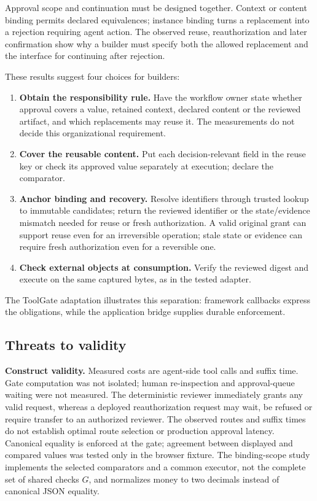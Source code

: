 Approval scope and continuation must be designed together. Context or content binding permits declared equivalences; instance binding turns a replacement into a rejection requiring agent action. The observed reuse, reauthorization and later confirmation show why a builder must specify both the allowed replacement and the interface for continuing after rejection.

These results suggest four choices for builders:
\begin{enumerate}
\tightlist
\item \textbf{Obtain the responsibility rule.} Have the workflow owner state whether approval covers a value, retained context, declared content or the reviewed artifact, and which replacements may reuse it. The measurements do not decide this organizational requirement.
\item \textbf{Cover the reusable content.} Put each decision-relevant field in the reuse key or check its approved value separately at execution; declare the comparator.
\item \textbf{Anchor binding and recovery.} Resolve identifiers through trusted lookup to immutable candidates; return the reviewed identifier or the state/evidence mismatch needed for reuse or fresh authorization. A valid original grant can support reuse even for an irreversible operation; stale state or evidence can require fresh authorization even for a reversible one.
\item \textbf{Check external objects at consumption.} Verify the reviewed digest and execute on the same captured bytes, as in the tested adapter.
\end{enumerate}

The ToolGate adaptation illustrates this separation: framework callbacks express the obligations, while the application bridge supplies durable enforcement.

\subsection{Threats to validity}\label{threats-to-validity}

\textbf{Construct validity.} Measured costs are agent-side tool calls and suffix time. Gate computation was not isolated; human re-inspection and approval-queue waiting were not measured. The deterministic reviewer immediately grants any valid request, whereas a deployed reauthorization request may wait, be refused or require transfer to an authorized reviewer. The observed routes and suffix times do not establish optimal route selection or production approval latency. Canonical equality is enforced at the gate; agreement between displayed and compared values was tested only in the browser fixture. The binding-scope study implements the selected comparators and a common executor, not the complete set of shared checks \(G\), and normalizes money to two decimals instead of canonical JSON equality.


